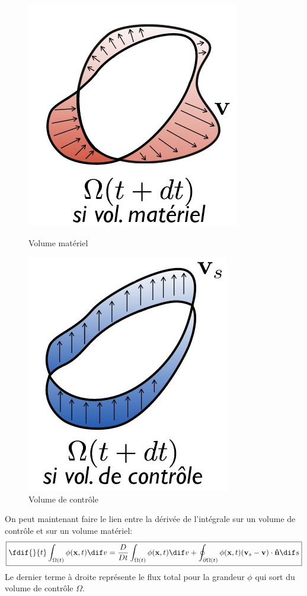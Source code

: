 \begin{figure}
    \begin{minipage}[b]{0.4\linewidth}
        \includegraphics[scale=0.5]{volmateriel.jpg}
        \caption{Volume matériel}
        \label{fig:volmat}
    \end{minipage}\hfill
    \begin{minipage}[b]{0.4\linewidth}
         \includegraphics[scale=0.5]{volcontrole.jpg}
         \caption{Volume de contrôle}
         \label{fig:volcont}
    \end{minipage}
\end{figure}

On peut maintenant faire le lien entre la dérivée de l'intégrale sur un volume de contrôle et sur un volume matériel:
\begin{equation}
  \label{comparaison_mat_cont}
  \boxed{\fdif{}{t}\int_{\Omega (t)}\phi(\fv{x},t) \dif v = \frac{D}{Dt}\int_{\Omega (t)}\phi(\fv{x},t) \dif v + \oint_{\partial \Omega (t)}\phi(\fv{x},t)(\fv{v}_s-\fv{v})\cdot \fv{\^n} \dif s}
\end{equation}
Le dernier terme à droite représente le flux total pour la grandeur $\phi$ qui sort du volume de contrôle $\Omega$.


